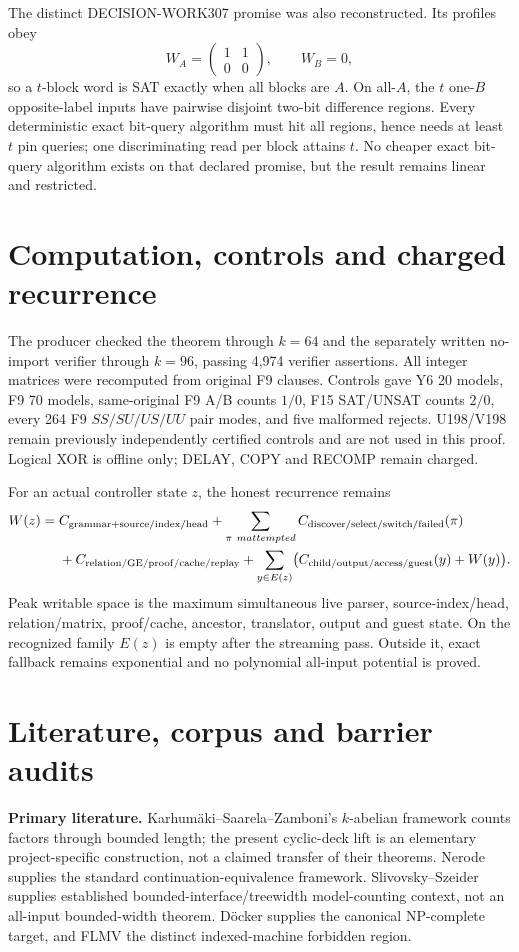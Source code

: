 \documentclass[11pt]{article}
\begin{document}
The distinct DECISION-WORK307 promise was also reconstructed.  Its profiles
obey
\[
W_A=\begin{pmatrix}1&1\\0&0\end{pmatrix},\qquad W_B=0,
\]
so a $t$-block word is SAT exactly when all blocks are $A$.  On all-$A$, the
$t$ one-$B$ opposite-label inputs have pairwise disjoint two-bit difference
regions.  Every deterministic exact bit-query algorithm must hit all regions,
hence needs at least $t$ pin queries; one discriminating read per block attains
$t$.  No cheaper exact bit-query algorithm exists on that declared promise, but
the result remains linear and restricted.

\section{Computation, controls and charged recurrence}
The producer checked the theorem through $k=64$ and the separately written
no-import verifier through $k=96$, passing 4,974 verifier assertions.  All
integer matrices were recomputed from original F9 clauses.  Controls gave Y6
20 models, F9 70 models, same-original F9 A/B counts $1/0$, F15 SAT/UNSAT
counts $2/0$, every 264 F9 $SS/SU/US/UU$ pair modes, and five malformed rejects.
U198/V198 remain previously independently certified controls and are not used in
this proof.  Logical XOR is offline only; DELAY, COPY and RECOMP remain charged.

For an actual controller state $z$, the honest recurrence remains
\[
\begin{aligned}
W(z)={}&C_{\rm grammar+source/index/head}
+\sum_{\pi\ {
m attempted}}C_{\rm discover/select/switch/failed}(\pi)\\
&+C_{\rm relation/GE/proof/cache/replay}
+\sum_{y\in E(z)}\bigl(C_{\rm child/output/access/guest}(y)+W(y)\bigr).
\end{aligned}
\]
Peak writable space is the maximum simultaneous live parser, source-index/head,
relation/matrix, proof/cache, ancestor, translator, output and guest state.  On
the recognized family $E(z)$ is empty after the streaming pass.  Outside it,
exact fallback remains exponential and no polynomial all-input potential is proved.

\section{Literature, corpus and barrier audits}
\sloppy
\textbf{Primary literature.} Karhum\"aki--Saarela--Zamboni's $k$-abelian
framework counts factors through bounded length; the present cyclic-deck lift is
an elementary project-specific construction, not a claimed transfer of their
theorems.  Nerode supplies the standard continuation-equivalence framework.
Slivovsky--Szeider supplies established bounded-interface/treewidth model-counting
context, not an all-input bounded-width theorem.  D\"ocker supplies the canonical
NP-complete target, and FLMV the distinct indexed-machine forbidden region.
\end{document}
